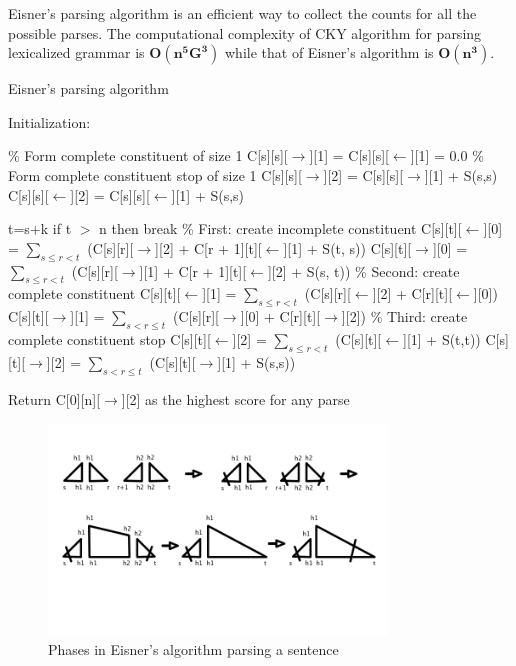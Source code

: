 \documentclass{book}
\begin{document}
Eisner's parsing algorithm is an efficient way to collect the counts for all the possible parses. The computational complexity of CKY algorithm for parsing lexicalized grammar is $\bm{O(n^5G^3)}$ while that of Eisner's algorithm is $\bm{O(n^3)}$.


\begin{algorithm}

\caption{Eisner's parsing algorithm}

\begin{algorithmic}

  \State Initialization:

        \State \% Form complete constituent of size 1
        \State C[s][s][$\rightarrow$][1] = C[s][s][$\leftarrow$][1] = 0.0
        \State \% Form complete constituent stop of size 1
        \State C[s][s][$\rightarrow$][2] = C[s][s][$\rightarrow$][1] + S(s,s)
        \State C[s][s][$\leftarrow$][2] = C[s][s][$\leftarrow$][1] + S(s,s)

\EndFor




    \State t=s+k
     \State if t $>$ n then break
     \State \% First: create incomplete constituent
      \State C[s][t][$\leftarrow$][0] = $\sum_{s \le r< t}$ (C[s][r][$\rightarrow$][2] + C[r + 1][t][$\leftarrow$][1] + S(t, s)) 
      \State C[s][t][$\rightarrow$][0] = $\sum_{s \le r<t}$ (C[s][r][$\rightarrow$][1] + C[r + 1][t][$\leftarrow$][2] + S(s, t)) 
      \State \% Second: create complete constituent
      \State C[s][t][$\leftarrow$][1] = $\sum_{s \le r<t}$ (C[s][r][$\leftarrow$][2] + C[r][t][$\leftarrow$][0])
      \State C[s][t][$\rightarrow$][1] = $\sum_{s<r \le t}$ (C[s][r][$\rightarrow$][0] + C[r][t][$\rightarrow$][2])
      \State \% Third: create complete constituent stop
      \State C[s][t][$\leftarrow$][2] = $\sum_{s \le r<t}$ (C[s][t][$\leftarrow$][1] + S(t,t))
      \State C[s][t][$\rightarrow$][2] = $\sum_{s<r \le t}$ (C[s][t][$\rightarrow$][1] + S(s,s))

\EndFor
\EndFor

      \State Return C[0][n][$\rightarrow$][2] as the highest score for any parse

\end{algorithmic}
\end{algorithm}


\begin{figure}
\centering
\includegraphics[width=90mm]{images/eisner_sentence.jpg}
\caption{Phases in Eisner's algorithm parsing a sentence}
\label{overflow}
\end{figure}
\end{document}
